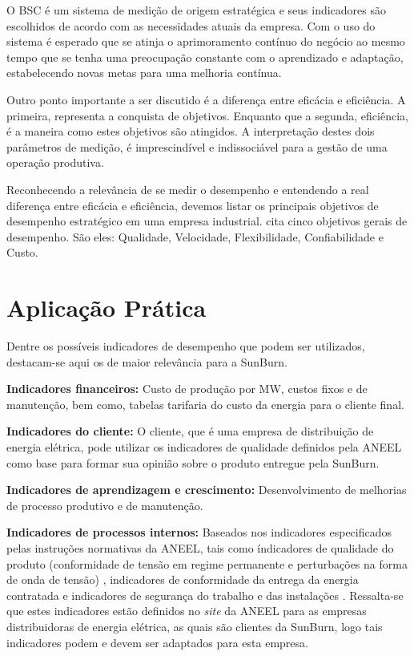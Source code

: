 O BSC é um sistema de medição de origem estratégica e seus indicadores são escolhidos de acordo com as necessidades atuais da empresa. Com o uso do sistema é esperado que se atinja o aprimoramento contínuo do negócio ao mesmo tempo que se tenha uma preocupação constante com o aprendizado e adaptação, estabelecendo novas metas para uma melhoria contínua.

Outro ponto importante a ser discutido é a diferença entre eficácia e eficiência. A primeira, representa a conquista de objetivos. Enquanto que a segunda, eficiência, é a maneira como estes objetivos são atingidos. A interpretação destes dois parâmetros de medição, é imprescindível e indissociável para a gestão de uma operação produtiva.

Reconhecendo a relevância de se medir o desempenho e entendendo a real diferença entre eficácia e eficiência, devemos listar os principais objetivos de desempenho estratégico em uma empresa industrial. %
\cite{slack2006administracao} cita cinco objetivos gerais de desempenho. São eles: Qualidade, Velocidade, Flexibilidade, Confiabilidade e Custo.

\section{Aplicação Prática}
\label{sec:estrategia_da_producao_aplicacao}
Dentre os possíveis indicadores de desempenho que podem ser utilizados, destacam-se aqui os de maior relevância para a SunBurn.

\textbf{Indicadores financeiros:} Custo de produção por MW, custos fixos e de manutenção, bem como, tabelas tarifaria do custo da energia para o cliente final.

\textbf{Indicadores do cliente:} O cliente, que é uma empresa de distribuição de energia elétrica, pode utilizar os indicadores de qualidade definidos pela \ac{ANEEL} como base para formar sua opinião sobre o produto entregue pela SunBurn.

\textbf{Indicadores de aprendizagem e crescimento:} Desenvolvimento de melhorias de processo produtivo e de manutenção.

\textbf{Indicadores de processos internos:} Baseados nos indicadores especificados pelas instruções normativas da \ac{ANEEL}, tais como índicadores de qualidade do produto (conformidade de tensão em regime permanente e perturbações na forma de onda de tensão) \cite{ANEEL_Produto}, indicadores de conformidade da entrega da energia contratada \cite{ANEEL_Continuidade} e indicadores de segurança do trabalho e das instalações \cite{ANEEL_Seguranca}. Ressalta-se que estes indicadores estão definidos no \textit{site} da \ac{ANEEL} para as empresas distribuidoras de energia elétrica, as quais são clientes da SunBurn, logo tais indicadores podem e devem ser adaptados para esta empresa.
